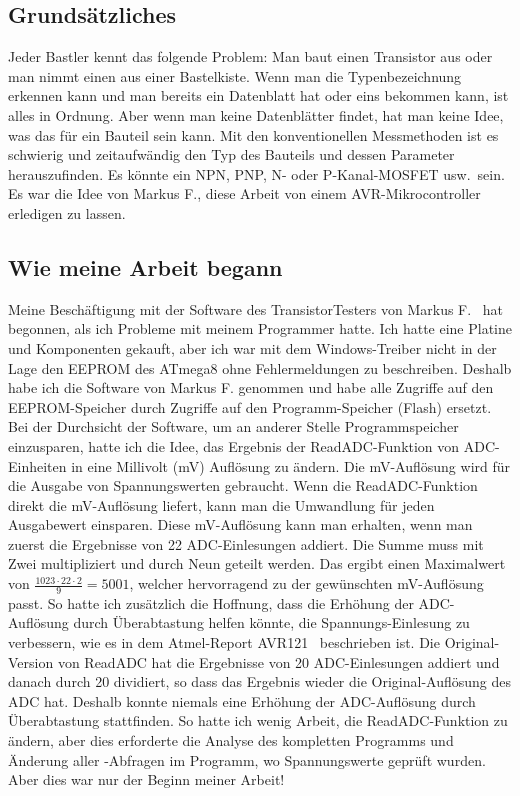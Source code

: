 \subsection*{Grundsätzliches}
Jeder Bastler kennt das folgende Problem: Man baut einen Transistor aus oder man nimmt einen aus einer Bastelkiste.
Wenn man die Typenbezeichnung erkennen kann und man bereits ein Datenblatt hat oder eins bekommen kann, ist alles in Ordnung.
Aber wenn man keine Datenblätter findet, hat man keine Idee, was das für ein Bauteil sein kann.
Mit den konventionellen Messmethoden ist es schwierig und zeitaufwändig den Typ des Bauteils und dessen Parameter herauszufinden.
Es könnte ein NPN, PNP, N- oder P-Kanal-MOSFET usw.\ sein. 
Es war die Idee von Markus F., diese Arbeit von einem AVR-Mikrocontroller erledigen zu lassen.

\subsection*{Wie meine Arbeit begann}
Meine Beschäftigung mit der Software des TransistorTesters von Markus F.~\cite{Frejek} hat begonnen, als ich Probleme mit
meinem Programmer hatte.
Ich hatte eine Platine und Komponenten gekauft, aber ich war mit dem Windows-Treiber nicht in der Lage den EEPROM des ATmega8
ohne Fehlermeldungen zu beschreiben.
Deshalb habe ich die Software von Markus F. genommen und habe alle Zugriffe auf den EEPROM-Speicher durch
Zugriffe auf den Programm-Speicher (Flash) ersetzt.
Bei der Durchsicht der Software, um an anderer Stelle Programmspeicher einzusparen, hatte ich die Idee,
das Ergebnis der ReadADC-Funktion von ADC-Einheiten in eine Millivolt (mV) Auflösung zu ändern.
Die mV-Auflösung wird für die Ausgabe von Spannungswerten gebraucht.
Wenn die ReadADC-Funktion direkt die mV-Auflösung liefert, kann man die Umwandlung für jeden Ausgabewert einsparen.
Diese mV-Auflösung kann man erhalten, wenn man zuerst die Ergebnisse von 22 ADC-Einlesungen addiert.
Die Summe muss mit Zwei multipliziert und durch Neun geteilt werden.
Das ergibt einen Maximalwert von \begin{math}\frac{1023\cdot22\cdot2}{9} = 5001\end{math},
welcher hervorragend zu der gewünschten mV-Auflösung passt.
So hatte ich zusätzlich die Hoffnung, dass die Erhöhung der ADC-Auflösung durch Überabtastung helfen
könnte, die Spannungs-Einlesung zu verbessern, wie es in dem Atmel-Report AVR121~\cite{AVR121} beschrieben ist.
Die Original-Version von ReadADC hat die Ergebnisse von 20 ADC-Einlesungen addiert und danach durch 20 dividiert,
so dass das Ergebnis wieder die Original-Auflösung des ADC hat. Deshalb konnte niemals eine Erhöhung der ADC-Auflösung
durch Überabtastung stattfinden.
So hatte ich wenig Arbeit, die ReadADC-Funktion zu ändern, aber dies erforderte die Analyse des kompletten
Programms und Änderung aller -Abfragen im Programm, wo Spannungswerte geprüft wurden.
Aber dies war nur der Beginn meiner Arbeit!

